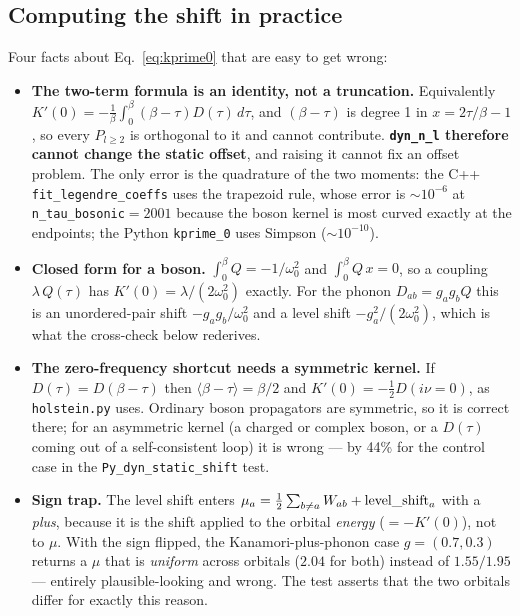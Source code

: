 \documentclass[a4paper,12pt]{article}
\renewcommand{\t}{\ensuremath{\tau}}
\newcommand{\w}{\ensuremath{\omega}}
\begin{document}
\subsection{Computing the shift in practice}
\label{sec:kprime-practice}

Four facts about Eq.~\eqref{eq:kprime0} that are easy to get wrong:

\begin{itemize}
  \item \textbf{The two-term formula is an identity, not a truncation.} Equivalently
    $K'(0)=-\tfrac1\beta\int_0^\beta(\beta-\t)D(\t)\,d\t$, and $(\beta-\t)$ is degree 1
    in $x=2\t/\beta-1$, so every $P_{l\ge2}$ is orthogonal to it and cannot contribute.
    \textbf{\texttt{dyn\_n\_l} therefore cannot change the static offset}, and raising it
    cannot fix an offset problem. The only error is the quadrature of the two moments:
    the C++ \texttt{fit\_legendre\_coeffs} uses the trapezoid rule, whose error is
    ${\sim}10^{-6}$ at \texttt{n\_tau\_bosonic}${}=2001$ because the boson kernel is most
    curved exactly at the endpoints; the Python \texttt{kprime\_0} uses Simpson
    (${\sim}10^{-10}$).
  \item \textbf{Closed form for a boson.} $\int_0^\beta Q = -1/\w_0^2$ and
    $\int_0^\beta Q\,x = 0$, so a coupling $\lambda\,Q(\t)$ has
    $K'(0)=\lambda/(2\w_0^2)$ exactly. For the phonon $D_{ab}=g_ag_bQ$ this is an
    unordered-pair shift $-g_ag_b/\w_0^2$ and a level shift $-g_a^2/(2\w_0^2)$, which is
    what the cross-check below rederives.
  \item \textbf{The zero-frequency shortcut needs a symmetric kernel.} If
    $D(\t)=D(\beta-\t)$ then $\langle\beta-\t\rangle=\beta/2$ and
    $K'(0)=-\tfrac12 D(i\nu=0)$, as \texttt{holstein.py} uses. Ordinary boson propagators
    are symmetric, so it is correct there; for an asymmetric kernel (a charged or complex
    boson, or a $D(\t)$ coming out of a self-consistent loop) it is wrong --- by 44\% for
    the control case in the \texttt{Py\_dyn\_static\_shift} test.
  \item \textbf{Sign trap.} The level shift enters
    $\mu_a=\tfrac12\sum_{b\neq a}W_{ab}+{\rm level\_shift}_a$ with a \emph{plus}, because
    it is the shift applied to the orbital \emph{energy} ($=-K'(0)$), not to $\mu$. With
    the sign flipped, the Kanamori-plus-phonon case $g=(0.7,0.3)$ returns a $\mu$ that is
    \emph{uniform} across orbitals ($2.04$ for both) instead of $1.55/1.95$ --- entirely
    plausible-looking and wrong. The test asserts that the two orbitals differ for
    exactly this reason.
\end{itemize}
\end{document}
